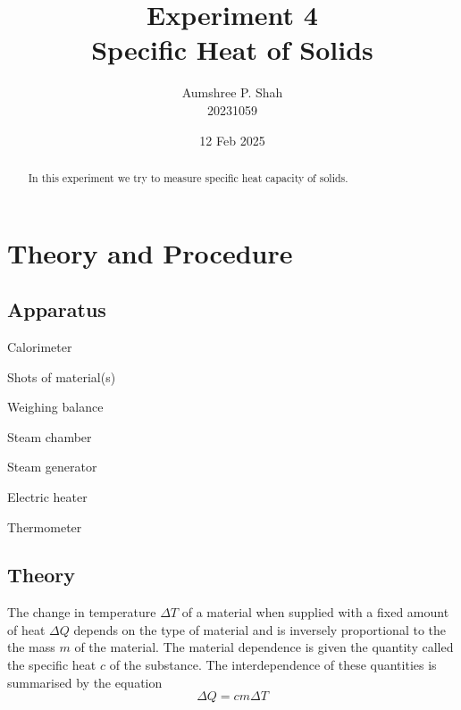 \documentclass[%
 sor,
 jor,
 amsmath,amssymb,
 reprint,%
]{revtex4-2}
\begin{document}

\title{Experiment 4\\Specific Heat of Solids}

\author{Aumshree P. Shah\\20231059\color{red}}
\altaffiliation[\color{red}]{aumshree.pinkalbenshah@students.iiserpune.ac.in}
\date{12 Feb 2025}
\vspace{1cm}
\begin{abstract}
\centering
In this experiment we try to measure specific heat capacity of solids.
\end{abstract}
\maketitle
\section{Theory and Procedure}
\subsection{Apparatus}

{\small
\begin{itemize}
\begin{minipage}[t]{0.45\textwidth}
    \item Calorimeter
    \item Shots of material(s)
    \item Weighing balance
    \item Steam chamber
\end{minipage}
\hfill
\begin{minipage}[t]{0.45\textwidth}
    \item Steam generator
    \item Electric heater
    \item Thermometer
\end{minipage}
\end{itemize}
}

\subsection{Theory}

The change in temperature $\Delta T$ of a material when supplied with a fixed amount of heat $\Delta Q$ depends
on the type of material and is inversely proportional to the the mass $m$ of the material. The material dependence
is given the quantity called the specific heat $c$ of the substance. The interdependence of these quantities is
summarised by the equation$$\Delta Q= cm \Delta T$$
\end{document}
